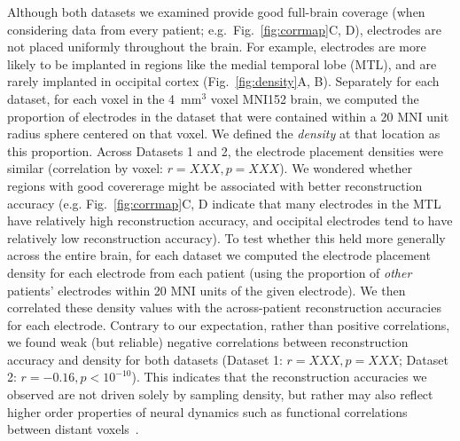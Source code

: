 \documentclass[11pt]{article}
\begin{document}
Although both datasets we examined provide good full-brain coverage
(when considering data from every patient; e.g.\
Fig.~\ref{fig:corrmap}C, D), electrodes are not placed uniformly
throughout the brain.  For example, electrodes are more likely to be
implanted in regions like the medial temporal lobe (MTL), and are
rarely implanted in occipital cortex (Fig.~\ref{fig:density}A, B).
Separately for each dataset, for each voxel in the 4~mm$^3$ voxel
MNI152 brain, we computed the proportion of electrodes in the dataset
that were contained within a 20 MNI unit radius sphere centered on
that voxel.  We defined the \textit{density} at that location as this
proportion.  Across Datasets 1 and 2, the electrode placement
densities were similar (correlation by voxel:
$r = XXX, p = XXX$).  We wondered whether regions with good
covererage might be associated with better reconstruction accuracy
(e.g. Fig.~\ref{fig:corrmap}C, D indicate that many electrodes in the
MTL have relatively high reconstruction accuracy, and occipital
electrodes tend to have relatively low reconstruction accuracy).  To
test whether this held more generally across the entire brain, for
each dataset we computed the electrode placement density for each
electrode from each patient (using the proportion of \textit{other}
patients' electrodes within 20 MNI units of the given electrode).  We
then correlated these density values with the across-patient
reconstruction accuracies for each electrode.  Contrary to our
expectation, rather than positive correlations, we found weak (but
reliable) negative correlations between reconstruction accuracy and
density for both datasets (Dataset 1: $r = XXX, p = XXX$; Dataset 2:
$r = -0.16, p < 10^{-10}$).  This indicates that the reconstruction
accuracies we observed are not driven solely by sampling density, but
rather may also reflect higher order properties of neural dynamics
such as functional correlations between distant
voxels~\citep{BetzEtal17b}.
\end{document}
